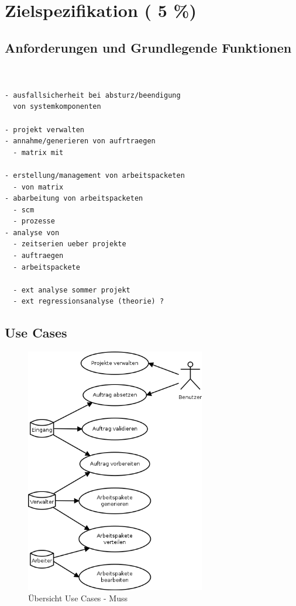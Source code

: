 \chapter{Zielspezifikation ( 5 \%)}





\section{Anforderungen und Grundlegende Funktionen}

\begin{verbatim}


- ausfallsicherheit bei absturz/beendigung
  von systemkomponenten

- projekt verwalten
- annahme/generieren von aufrtraegen
  - matrix mit

- erstellung/management von arbeitspacketen
  - von matrix
- abarbeitung von arbeitspacketen
  - scm
  - prozesse
- analyse von
  - zeitserien ueber projekte
  - auftraegen
  - arbeitspackete

  - ext analyse sommer projekt
  - ext regressionsanalyse (theorie) ?
\end{verbatim}

\section{Use Cases}



\begin{figure}[ht]
  \label{fig:use-case-muss}
  \begin{center}
      \includegraphics[width=0.7\textwidth]{imageinput/use-case-muss.png}
  \end{center}
  \caption{\"Ubersicht Use Cases - Muss}
\end{figure}


